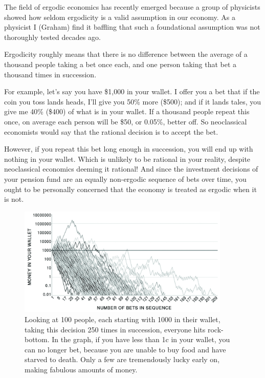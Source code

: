 The field of ergodic economics has recently emerged because a group of physicists showed how seldom ergodicity is a valid assumption in our economy\cite{buchanan-ergodicity, peters-ergodicity-economics}. As a physicist I (Graham) find it baffling that such a foundational assumption was not thoroughly tested decades ago. 


Ergodicity roughly means that there is no difference between the average of a thousand people taking a bet once each, and one person taking that bet a thousand times in succession.


For example\cite{peters-ergodicity-economics}, let's say you have \$1,000 in your wallet. I offer you a bet that if the coin you toss lands heads, I'll give you 50\% more (\$500); and if it lands tales, you give me 40\% (\$400) of what is in your wallet. If a thousand people repeat this once, on average each person will be \$50, or 0.05\%, better off. So neoclassical economists  would say that the rational decision is to accept the bet.


However, if you repeat this bet long enough in succession, you will end up with nothing in your wallet. Which is unlikely to be rational in your reality, despite neoclassical economics deeming it rational!  And since the investment decisions of your pension fund are an equally non-ergodic sequence of bets over time, you ought to be personally concerned that the economy is treated as ergodic when it is not.


\begin{figure}
\centering
\includegraphics[width=0.90\textwidth]{./Images/bet-path-1c-cutoff}
\caption[Losing money long term even on a good bet.]{Looking at 100 people, each starting with 1000 in their wallet,  taking this decision 250 times in succession, everyone hits rock-bottom. In the graph, if you have less than 1c in your wallet, you can no longer bet, because you are unable to buy food and have starved to death. Only a few are tremendously lucky early on, making fabulous amounts of money.}
\label{fig:bet-path-1c-cutoff}
\end{figure}



